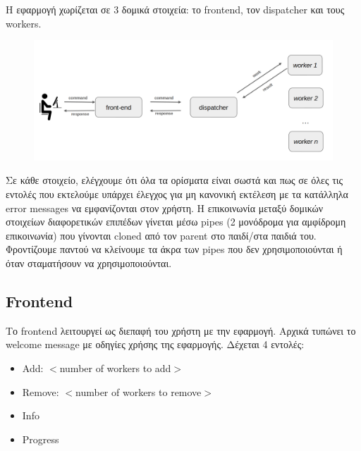 \documentclass{article}
\begin{document}
	\noindent Η εφαρμογή χωρίζεται σε 3 δομικά στοιχεία: το frontend, τον dispatcher και τους workers.
	
	\begin{figure}[H]
		\centering
		\includegraphics[width=\textwidth]{a1.4_Workflow}
	\end{figure}

	Σε κάθε στοιχείο, ελέγχουμε ότι όλα τα ορίσματα είναι σωστά και πως σε όλες τις εντολές που εκτελούμε υπάρχει έλεγχος για μη κανονική εκτέλεση με τα κατάλληλα error messages να εμφανίζονται στον χρήστη. Η επικοινωνία μεταξύ δομικών στοιχείων διαφορετικών επιπέδων γίνεται μέσω pipes (2 μονόδρομα για αμφίδρομη επικοινωνία) που γίνονται cloned από τον parent στο παιδί/στα παιδιά του. Φροντίζουμε παντού να κλείνουμε τα άκρα των pipes που δεν χρησιμοποιούνται ή όταν σταματήσουν να χρησιμοποιούνται.
	
	\subsection{Frontend}

	Το frontend λειτουργεί ως διεπαφή του χρήστη με την εφαρμογή. Αρχικά τυπώνει το welcome message με οδηγίες χρήσης της εφαρμογής. Δέχεται 4 εντολές:
	\begin{itemize}
		\item Add: $<$number of workers to add$>$
		\item Remove: $<$number of workers to remove$>$
		\item Info
		\item Progress
	\end{itemize}
	
\end{document}
